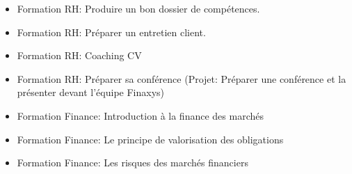 \begin{itemize}  
    \item Formation RH: Produire un bon dossier de compétences.
    \item Formation RH: Préparer un entretien client.
    \item Formation RH: Coaching CV
    \item Formation RH: Préparer sa conférence (Projet: Préparer une conférence et la présenter devant l'équipe Finaxys)
    \item Formation Finance: Introduction à la finance des marchés
    \item Formation Finance: Le principe de valorisation des obligations
    \item Formation Finance: Les risques des marchés financiers
\end{itemize}